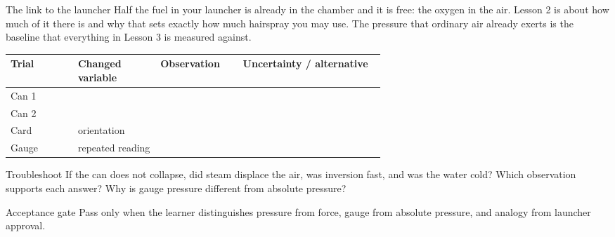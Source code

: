 \begin{telospanel}{The link to the launcher}
Half the fuel in your launcher is already in the chamber and it is free: the
oxygen in the air. Lesson 2 is about how much of it there is and why that sets
exactly how much hairspray you may use. The pressure that ordinary air already
exerts is the baseline that everything in Lesson 3 is measured against.
\end{telospanel}
\begin{tabularx}{\linewidth}{@{}p{0.18\linewidth}p{0.22\linewidth}p{0.22\linewidth}L@{}}
\toprule
\textbf{Trial} & \textbf{Changed variable} & \textbf{Observation} &
\textbf{Uncertainty / alternative}\\
\midrule
Can 1 & & \rule{0pt}{2.6ex} &\\
Can 2 & & &\\
Card & orientation & &\\
Gauge & repeated reading & &\\
\bottomrule
\end{tabularx}
\begin{telospanel}{Troubleshoot}
If the can does not collapse, did steam displace the air, was inversion fast,
and was the water cold? Which observation supports each answer? Why is gauge
pressure different from absolute pressure?
\end{telospanel}
\begin{teloshazard}{Acceptance gate}
Pass only when the learner distinguishes pressure from force, gauge from
absolute pressure, and analogy from launcher approval.
\end{teloshazard}

